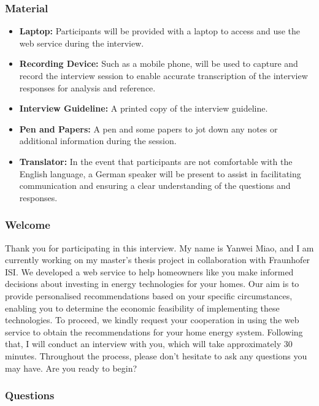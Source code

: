 \subsubsection{Material}

\begin{itemize}
  \item \textbf{Laptop:} Participants will be provided with a laptop to access and use the web service during the interview. 
  \item \textbf{Recording Device:} Such as a mobile phone, will be used to capture and record the interview session to enable accurate transcription of the interview responses for analysis and reference.
  \item \textbf{Interview Guideline:} A printed copy of the interview guideline.
  \item \textbf{Pen and Papers:} A pen and some papers to jot down any notes or additional information during the session. 
  \item \textbf{Translator:} In the event that participants are not comfortable with the English language, a German speaker will be present to assist in facilitating communication and ensuring a clear understanding of the questions and responses.
\end{itemize}


\subsubsection{Welcome}

Thank you for participating in this interview. 
My name is Yanwei Miao, and I am currently working on my master's thesis project in collaboration with Fraunhofer ISI.
We developed a web service to help homeowners like you make informed decisions about investing in energy technologies for your homes. 
Our aim is to provide personalised recommendations based on your specific circumstances, enabling you to determine the economic feasibility of implementing these technologies. 
To proceed, we kindly request your cooperation in using the web service to obtain the recommendations for your home energy system. 
Following that, I will conduct an interview with you, which will take approximately 30 minutes. 
Throughout the process, please don't hesitate to ask any questions you may have. 
Are you ready to begin?


\subsubsection{Questions}

